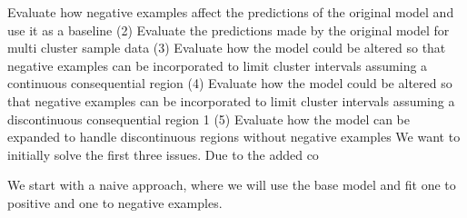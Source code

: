 \documentclass[]{scrartcl}
\begin{document}
\noindent
Evaluate how negative examples affect the predictions of the original model and use it as a baseline
(2) Evaluate the predictions made by the original model for multi cluster sample data
(3) Evaluate how the model could be altered so that negative examples can be incorporated to limit cluster intervals assuming a continuous consequential region
(4) Evaluate how the model could be altered so that negative examples can be incorporated to limit cluster intervals assuming a discontinuous consequential region
1
(5) Evaluate how the model can be expanded to handle discontinuous regions without
negative examples
We want to initially solve the first three issues. Due to the added co

We start with a naive approach, where we will use the base model and fit one to positive and one to negative examples.

\centering

\nocite{*}
\printbibliography
\end{document}
